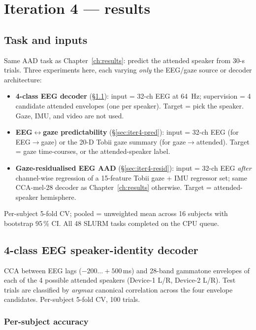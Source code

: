 \chapter{Iteration 4 --- results}
\label{ch:iter4}

\section*{Task and inputs}

Same AAD task as Chapter~\ref{ch:results}: predict the attended speaker
from 30-s trials. Three experiments here, each varying \emph{only} the
EEG/gaze source or decoder architecture:

\begin{itemize}
  \item \textbf{4-class EEG decoder} (§\ref{sec:iter4-4class}): input =
        32-ch EEG at \SI{64}{\Hz}; supervision = 4 candidate attended
        envelopes (one per speaker). Target = pick the speaker. Gaze,
        IMU, and video are not used.
  \item \textbf{EEG$\leftrightarrow$gaze predictability}
        (§\ref{sec:iter4-pred}): input = 32-ch EEG (for EEG$\to$gaze) or
        the 20-D Tobii gaze summary (for gaze$\to$attended). Target =
        gaze time-courses, or the attended-speaker label.
  \item \textbf{Gaze-residualised EEG AAD}
        (§\ref{sec:iter4-resid}): input = 32-ch EEG \emph{after}
        channel-wise regression of a 15-feature Tobii gaze + IMU
        regressor set; same CCA-mel-28 decoder as Chapter~\ref{ch:results}
        otherwise. Target = attended-speaker hemisphere.
\end{itemize}

Per-subject 5-fold CV; pooled = unweighted mean across 16 subjects with
bootstrap 95\,\% CI. All 48 SLURM tasks completed on the
 CPU queue.

\section{4-class EEG speaker-identity decoder}
\label{sec:iter4-4class}

CCA between EEG lags ($-200\ldots+500$\,ms) and 28-band gammatone envelopes
of each of the 4 possible attended speakers (Device-1 L/R, Device-2 L/R).
Test trials are classified by \emph{argmax} canonical correlation across
the four envelope candidates. Per-subject 5-fold CV, 100 trials.

\subsection{Per-subject accuracy}

